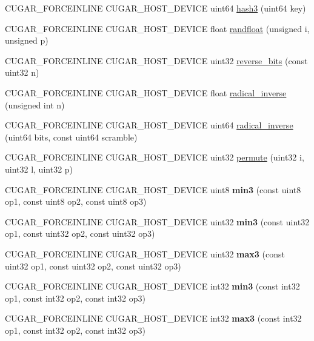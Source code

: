 \begin{DoxyCompactItemize}
\item 
C\+U\+G\+A\+R\+\_\+\+F\+O\+R\+C\+E\+I\+N\+L\+I\+NE C\+U\+G\+A\+R\+\_\+\+H\+O\+S\+T\+\_\+\+D\+E\+V\+I\+CE uint64 \hyperlink{group___basic_ga97e40904e3a80762d095028d2539137d}{hash3} (uint64 key)
\item 
C\+U\+G\+A\+R\+\_\+\+F\+O\+R\+C\+E\+I\+N\+L\+I\+NE C\+U\+G\+A\+R\+\_\+\+H\+O\+S\+T\+\_\+\+D\+E\+V\+I\+CE float \hyperlink{group___basic_ga215e28e8a87955931f3cdb9b9797ff68}{randfloat} (unsigned i, unsigned p)
\item 
C\+U\+G\+A\+R\+\_\+\+F\+O\+R\+C\+E\+I\+N\+L\+I\+NE C\+U\+G\+A\+R\+\_\+\+H\+O\+S\+T\+\_\+\+D\+E\+V\+I\+CE uint32 \hyperlink{group___basic_ga731aa073264ceb5396fc95800295bd0a}{reverse\+\_\+bits} (const uint32 n)
\item 
C\+U\+G\+A\+R\+\_\+\+F\+O\+R\+C\+E\+I\+N\+L\+I\+NE C\+U\+G\+A\+R\+\_\+\+H\+O\+S\+T\+\_\+\+D\+E\+V\+I\+CE float \hyperlink{group___basic_gae90dc4da8454b145d3307d6dadbc3c37}{radical\+\_\+inverse} (unsigned int n)
\item 
C\+U\+G\+A\+R\+\_\+\+F\+O\+R\+C\+E\+I\+N\+L\+I\+NE C\+U\+G\+A\+R\+\_\+\+H\+O\+S\+T\+\_\+\+D\+E\+V\+I\+CE uint64 \hyperlink{group___basic_ga1a2fbc282e52dbc566f9cc0515caf6de}{radical\+\_\+inverse} (uint64 bits, const uint64 scramble)
\item 
C\+U\+G\+A\+R\+\_\+\+F\+O\+R\+C\+E\+I\+N\+L\+I\+NE C\+U\+G\+A\+R\+\_\+\+H\+O\+S\+T\+\_\+\+D\+E\+V\+I\+CE uint32 \hyperlink{group___basic_gaa122cc1105ff380e14ba6a41f47dcc71}{permute} (uint32 i, uint32 l, uint32 p)
\item 
C\+U\+G\+A\+R\+\_\+\+F\+O\+R\+C\+E\+I\+N\+L\+I\+NE C\+U\+G\+A\+R\+\_\+\+H\+O\+S\+T\+\_\+\+D\+E\+V\+I\+CE uint8 {\bfseries min3} (const uint8 op1, const uint8 op2, const uint8 op3)
\item 
C\+U\+G\+A\+R\+\_\+\+F\+O\+R\+C\+E\+I\+N\+L\+I\+NE C\+U\+G\+A\+R\+\_\+\+H\+O\+S\+T\+\_\+\+D\+E\+V\+I\+CE uint32 {\bfseries min3} (const uint32 op1, const uint32 op2, const uint32 op3)
\item 
C\+U\+G\+A\+R\+\_\+\+F\+O\+R\+C\+E\+I\+N\+L\+I\+NE C\+U\+G\+A\+R\+\_\+\+H\+O\+S\+T\+\_\+\+D\+E\+V\+I\+CE uint32 {\bfseries max3} (const uint32 op1, const uint32 op2, const uint32 op3)
\item 
C\+U\+G\+A\+R\+\_\+\+F\+O\+R\+C\+E\+I\+N\+L\+I\+NE C\+U\+G\+A\+R\+\_\+\+H\+O\+S\+T\+\_\+\+D\+E\+V\+I\+CE int32 {\bfseries min3} (const int32 op1, const int32 op2, const int32 op3)
\item 
C\+U\+G\+A\+R\+\_\+\+F\+O\+R\+C\+E\+I\+N\+L\+I\+NE C\+U\+G\+A\+R\+\_\+\+H\+O\+S\+T\+\_\+\+D\+E\+V\+I\+CE int32 {\bfseries max3} (const int32 op1, const int32 op2, const int32 op3)

\end{DoxyCompactItemize}
